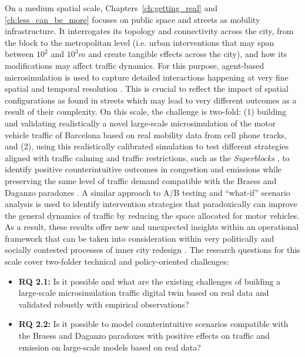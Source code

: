 On a medium spatial scale, Chapters~\ref{ch:getting_real} and \ref{ch:less_can_be_more} focuses on public space and streets as mobility infrastructure. It interrogates its topology and connectivity across the city, from the block to the metropolitan level (i.e. urban interventions that may span between $10^2$ and $10^3 m$ and create tangible effects across the city), and how its modifications may affect traffic dynamics. For this purpose, agent-based microsimulation is used to capture detailed interactions happening at very fine spatial and temporal resolution \citep{Treiber2013}. This is crucial to reflect the impact of spatial configurations as found in streets which may lead to very different outcomes as a result of their complexity. On this scale, the challenge is two-fold: (1) building and validating realistically a novel large-scale microsimulation of the motor vehicle traffic of Barcelona based on real mobility data from cell phone tracks, and (2), using this realistically calibrated simulation to test different strategies aligned with traffic calming and traffic restrictions, such as the \emph{Superblocks} \citep{Rueda2018}, to identify positive counterintuitive outcomes in congestion and emissions while preserving the same level of traffic demand compatible with the Braess and Daganzo paradoxes \citep{Braess1969,Sheffi1978}. A similar approach to A/B testing and ``what-if'' scenario analysis \citep{Golfarelli2006, Rizzi2009,Kohavi2017,Carlino2022} is used to identify intervention strategies that paradoxically can improve the general dynamics of traffic by reducing the space allocated for motor vehicles. 
As a result, these results offer new and unexpected insights within an operational framework that can be taken into consideration within very politically and socially contested processes of inner city redesign \citep{Zografos2020}. The research questions for this scale cover two-folder technical and policy-oriented challenges:
\begin{itemize}
    \item \textbf{RQ 2.1:} Is it possible and what are the existing challenges of building a large-scale microsimulation traffic digital twin based on real data and validated robustly with empirical observations?
    \item \textbf{RQ 2.2:} Is it possible to model counterintuitive scenarios compatible with the Braess and Daganzo paradoxes with positive effects on traffic and emission on large-scale models based on real data?
\end{itemize}

